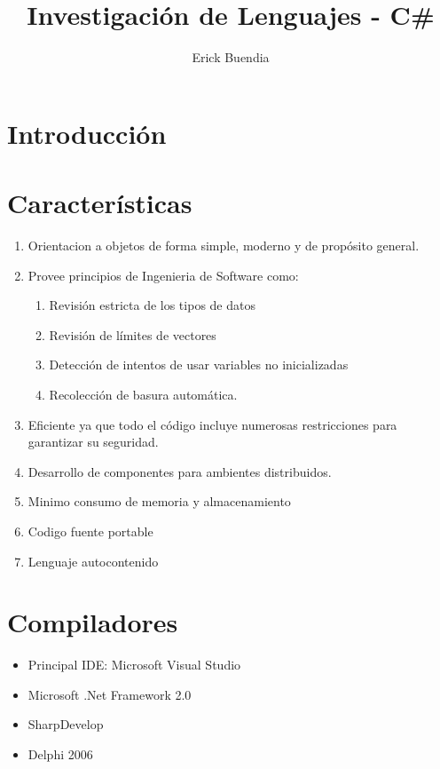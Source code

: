 \documentclass[11pt]{article} %
\title{Investigación de Lenguajes - C\#}
\author{Erick Buendia}
\begin{document}
\maketitle

\section{Introducción}


\section{Características}

 \begin{enumerate}
 \item Orientacion a objetos de forma simple, moderno y de propósito general.
 \item Provee principios de Ingenieria de Software como:
	\begin{enumerate}
 		\item Revisión estricta de los tipos de datos
 		\item Revisión de límites de vectores
		\item Detección de intentos de usar variables no inicializadas
		\item Recolección de basura automática.
	 \end{enumerate}
\item Eficiente ya que todo el código incluye numerosas restricciones para garantizar su seguridad.
\item Desarrollo de componentes para ambientes distribuidos.
\item Minimo consumo de memoria y almacenamiento
\item Codigo fuente portable
\item Lenguaje autocontenido

\end{enumerate} 

\section{Compiladores}

\begin{itemize}
 \item Principal IDE:  Microsoft Visual Studio
 \item Microsoft .Net Framework 2.0
 \item SharpDevelop
 \item Delphi 2006
\end{itemize} 
\end{document}
